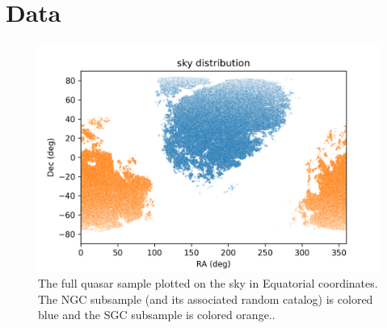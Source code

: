 \documentclass[modern]{aastex631}
\newlength{\figurewidth}
\begin{document}
\section{Data}

\begin{figure}[t!]
  \begin{mdframed}
  \color{captiongray}
  \begin{center}
    \includegraphics[width=\figurewidth]{notebooks/radec.png}
  \end{center}
    \caption{The full quasar sample plotted on the sky in Equatorial coordinates.
    The NGC subsample (and its associated random catalog) is colored blue and the SGC subsample is colored orange.\label{fig:radec}.}
  \end{mdframed}
\end{figure}
\end{document}
